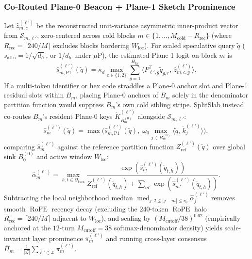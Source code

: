 \documentclass[final,5p,times,twocolumn]{elsarticle}
\theoremstyle{definition}
\theoremstyle{remark}
\newcommand{\SplitSlab}{\textup{\textsc{SplitSlab}}}
\newcommand{\RoPE}{\operatorname{RoPE}}
\def\SplitSlab{SplitSlab}%
\begin{document}
\subsubsection{Co-Routed Plane-0 Beacon + Plane-1 Sketch Prominence}
Let $\hat{z}_{m,c}^{(\ell')}$ be the reconstructed unit-variance asymmetric inner-product vector from $\mathcal{S}_{m,\ell'}$, zero-centered across cold blocks $m \in \{1,\dots,M_{\mathrm{cold}}-R_{\mathrm{rec}}\}$ (where $R_{\mathrm{rec}} = \lceil 240/M \rceil$ excludes blocks bordering $W_{\mathrm{loc}}$). For scaled speculative query $\tilde{q}$ ($s_{\mathrm{attn}} = 1/\sqrt{d_h}$, or $1/d_h$ under $\mu\text{P}$), the estimated Plane-1 logit on block $m$ is
\begin{equation}\label{eq:est_logit}
\hat{s}_{m,\mathrm{P1}}^{(\ell')}(\tilde{q}) = \kappa_d \max_{c \in \{1,2\}} \sum_{g=1}^{H_{\mathrm{kv}}} \big\langle P_{\ell',g}^\top \tilde{q}_{g,r},\, \hat{z}_{m,c,g}^{(\ell')} \big\rangle.
\end{equation}
If a multi-token identifier or hex code straddles a Plane-0 anchor slot and Plane-1 residual slots within $B_m$, placing Plane-0 anchors of $B_m$ solely in the denominator partition function would suppress $B_m$'s own cold sibling stripe. \SplitSlab{} instead co-routes $B_m$'s resident Plane-0 keys $\mathring{K}_{B_m^{(0)}}^{(\ell')}$ alongside $\mathcal{S}_{m,\ell'}$:
\begin{equation}\label{eq:coroute}
\hat{s}_m^{(\ell')}(\tilde{q}) = \max\!\Big(\hat{s}_{m,\mathrm{P1}}^{(\ell')}(\tilde{q}),\; \omega_0 \max_{j \in B_m^{(0)}} \langle \tilde{q},\, \mathring{k}_j^{(\ell')} \rangle\Big),
\end{equation}
comparing $\hat{s}_m^{(\ell')}$ against the reference partition function $Z_{\mathrm{ref}}^{(\ell')}(\tilde{q})$ over global sink $B_0^{(0)}$ and active window $W_{\mathrm{loc}}$:
\begin{equation}\label{eq:alpha_hat}
\hat{\alpha}_m^{(\ell')} = \max_{h, t \in \mathcal{Q}_{\mathrm{turn}}} \frac{\exp(\hat{s}_m^{(\ell')}(\tilde{q}_{t,h}))}{Z_{\mathrm{ref}}^{(\ell')}(\tilde{q}_{t,h}) + \sum_{m'} \exp(\hat{s}_{m'}^{(\ell')}(\tilde{q}_{t,h}))}.
\end{equation}
Subtracting the local neighborhood median $\operatorname{med}_{j: 2 \le |j-m| \le r_0} \hat{\alpha}_j^{(\ell')}$ removes smooth $\RoPE$ recency decay (excluding the $240$-token $\RoPE$ halo $R_{\mathrm{rec}} = \lceil 240/M\rceil$ adjacent to $W_{\mathrm{loc}}$), and scaling by $(M_{\mathrm{cutoff}}/38)^{0.62}$ (empirically anchored at the $12$-turn $M_{\mathrm{cutoff}} = 38$ softmax-denominator density) yields scale-invariant layer prominence $\pi_m^{(\ell')}$ and running cross-layer consensus $\bar{\Pi}_m = \frac{1}{|\mathcal{L}|}\sum_{\ell' \in \mathcal{L}} \pi_m^{(\ell')}$.
\end{document}
